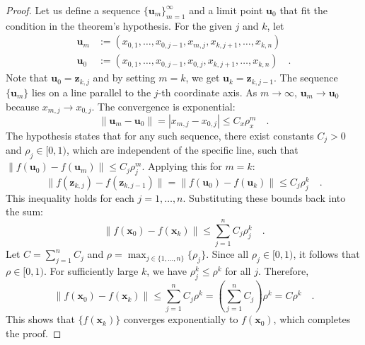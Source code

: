 \documentclass[../../main.tex]{subfiles}
\begin{document}
\begin{proof}
Let us define a sequence $\{\bm{u}_m\}_{m=1}^\infty$ and a limit point $\bm{u}_0$ that fit the condition in the theorem's hypothesis. For the given $j$ and $k$, let
\begin{align*}
    \bm{u}_m &:= (x_{0,1}, \dots, x_{0,j-1}, x_{m,j}, x_{k,j+1}, \dots, x_{k,n}) \\
    \bm{u}_0 &:= (x_{0,1}, \dots, x_{0,j-1}, x_{0,j}, x_{k,j+1}, \dots, x_{k,n}) \quad .
\end{align*}
Note that $\bm{u}_0 = \bm{z}_{k,j}$ and by setting $m=k$, we get $\bm{u}_k = \bm{z}_{k,j-1}$.
The sequence $\{\bm{u}_m\}$ lies on a line parallel to the $j$-th coordinate axis. As $m \to \infty$, $\bm{u}_m \to \bm{u}_0$ because $x_{m,j} \to x_{0,j}$. The convergence is exponential:
\[
    \|\bm{u}_m - \bm{u}_0\| = |x_{m,j} - x_{0,j}| \le C_x \rho_x^m \quad .
\]
The hypothesis states that for any such sequence, there exist constants $C_j > 0$ and $\rho_j \in [0, 1)$, which are independent of the specific line, such that $\|f(\bm{u}_0) - f(\bm{u}_m)\| \le C_j \rho_j^m$. Applying this for $m=k$:
\[
    \|f(\bm{z}_{k,j}) - f(\bm{z}_{k,j-1})\| = \|f(\bm{u}_0) - f(\bm{u}_k)\| \le C_j \rho_j^k \quad .
\]
This inequality holds for each $j=1, \dots, n$. Substituting these bounds back into the sum:
\[
    \|f(\bm{x}_0) - f(\bm{x}_k)\| \le \sum_{j=1}^{n} C_j \rho_j^k \quad .
\]
Let $C = \sum_{j=1}^{n} C_j$ and $\rho = \max_{j \in \{1, \dots, n\}} \{\rho_j\}$. Since all $\rho_j \in [0, 1)$, it follows that $\rho \in [0, 1)$. For sufficiently large $k$, we have $\rho_j^k \le \rho^k$ for all $j$. Therefore,
\[
    \|f(\bm{x}_0) - f(\bm{x}_k)\| \le \sum_{j=1}^{n} C_j \rho^k = \left( \sum_{j=1}^{n} C_j \right) \rho^k = C \rho^k \quad .
\]
This shows that $\{f(\bm{x}_k)\}$ converges exponentially to $f(\bm{x}_0)$, which completes the proof.
\end{proof}
\end{document}
